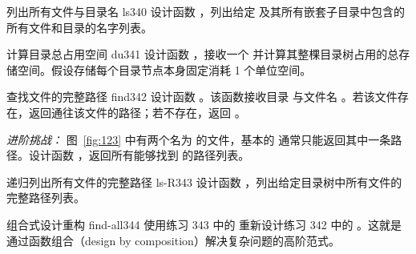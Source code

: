 \begin{exercise}{列出所有文件与目录名 ls}{340}
设计函数 ，列出给定  及其所有嵌套子目录中包含的所有文件和目录的名字列表。
\end{exercise}

\begin{exercise}{计算目录总占用空间 du}{341}
设计函数 ，接收一个  并计算其整棵目录树占用的总存储空间。假设存储每个目录节点本身固定消耗 1 个单位空间。
\end{exercise}

\begin{exercise}{查找文件的完整路径 find}{342}
设计函数 。该函数接收目录  与文件名 。若该文件存在，返回通往该文件的路径；若不存在，返回 。

\emph{进阶挑战：} 图~\ref{fig:123} 中有两个名为  的文件，基本的  通常只能返回其中一条路径。设计函数 ，返回所有能够找到  的路径列表。
\end{exercise}

\begin{exercise}{递归列出所有文件的完整路径 ls-R}{343}
设计函数 ，列出给定目录树中所有文件的完整路径列表。
\end{exercise}

\begin{exercise}{组合式设计重构 find-all}{344}
使用练习 343 中的  重新设计练习 342 中的 。这就是通过函数组合（design by composition）解决复杂问题的高阶范式。
\end{exercise}
